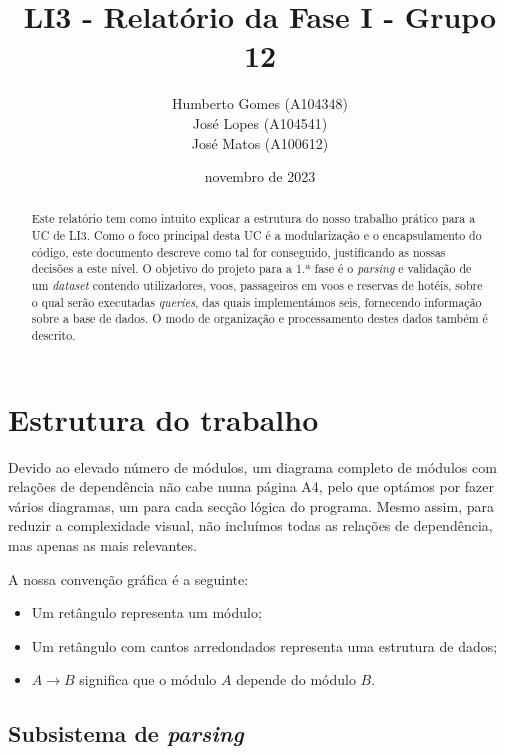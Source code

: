 \documentclass[12pt, a4paper]{article}
\title{\textbf{LI3 - Relatório da Fase I - Grupo 12}}
\author{
	Humberto Gomes (A104348) \\
	José Lopes     (A104541) \\
	José Matos     (A100612) \\
}
\date{novembro de 2023}
\begin{document}
\maketitle
\onehalfspacing
\setlength{\parskip}{\baselineskip}
\setlength{\parindent}{0pt}

\begin{abstract}
    Este relatório tem como intuito explicar a estrutura do nosso trabalho prático para a UC de LI3.
    Como o foco principal desta UC é a modularização e o encapsulamento do código, este documento
    descreve como tal for conseguido, justificando as nossas decisões a este nível. O objetivo do
    projeto para a 1.ª fase é o \emph{parsing} e validação de um \emph{dataset} contendo
    utilizadores, voos, passageiros em voos e reservas de hotéis, sobre o qual serão executadas
    \emph{queries}, das quais implementámos seis, fornecendo informação sobre a base de dados. O
    modo de organização e processamento destes dados também é descrito.
\end{abstract}

\section{Estrutura do trabalho}

Devido ao elevado número de módulos, um diagrama completo de módulos com relações de dependência
não cabe numa página A4, pelo que optámos por fazer vários diagramas, um para cada secção lógica
do programa. Mesmo assim, para reduzir a complexidade visual, não incluímos todas as relações de
dependência, mas apenas as mais relevantes.

A nossa convenção gráfica é a seguinte:

\begin{itemize}
	\item Um retângulo representa um módulo;
	\item Um retângulo com cantos arredondados representa uma estrutura de dados;
	\item $A \rightarrow B$ significa que o módulo $A$ depende do módulo $B$.
\end{itemize}

\subsection{Subsistema de \emph{parsing}}
\end{document}
